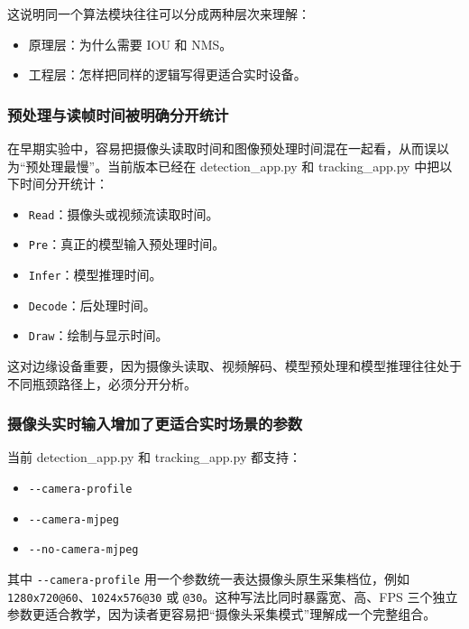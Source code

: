 这说明同一个算法模块往往可以分成两种层次来理解：

\begin{itemize}
\tightlist
\item
  原理层：为什么需要 IOU 和 NMS。
\item
  工程层：怎样把同样的逻辑写得更适合实时设备。
\end{itemize}

\subsubsection{预处理与读帧时间被明确分开统计}\label{src-experiment-case2-h77}

在早期实验中，容易把摄像头读取时间和图像预处理时间混在一起看，从而误以为``预处理最慢''。当前版本已经在
detection\_app.py 和 tracking\_app.py 中把以下时间分开统计：

\begin{itemize}
\tightlist
\item
  \passthrough{\lstinline!Read!}：摄像头或视频流读取时间。
\item
  \passthrough{\lstinline!Pre!}：真正的模型输入预处理时间。
\item
  \passthrough{\lstinline!Infer!}：模型推理时间。
\item
  \passthrough{\lstinline!Decode!}：后处理时间。
\item
  \passthrough{\lstinline!Draw!}：绘制与显示时间。
\end{itemize}

这对边缘设备重要，因为摄像头读取、视频解码、模型预处理和模型推理往往处于不同瓶颈路径上，必须分开分析。

\subsubsection{摄像头实时输入增加了更适合实时场景的参数}\label{src-experiment-case2-h78}

当前 detection\_app.py 和 tracking\_app.py 都支持：

\begin{itemize}
\tightlist
\item
  \passthrough{\lstinline!--camera-profile!}
\item
  \passthrough{\lstinline!--camera-mjpeg!}
\item
  \passthrough{\lstinline!--no-camera-mjpeg!}
\end{itemize}

其中 \passthrough{\lstinline!--camera-profile!}
用一个参数统一表达摄像头原生采集档位，例如
\passthrough{\lstinline!1280x720@60!}、\passthrough{\lstinline!1024x576@30!}
或 \passthrough{\lstinline!@30!}。这种写法比同时暴露宽、高、FPS
三个独立参数更适合教学，因为读者更容易把``摄像头采集模式''理解成一个完整组合。


